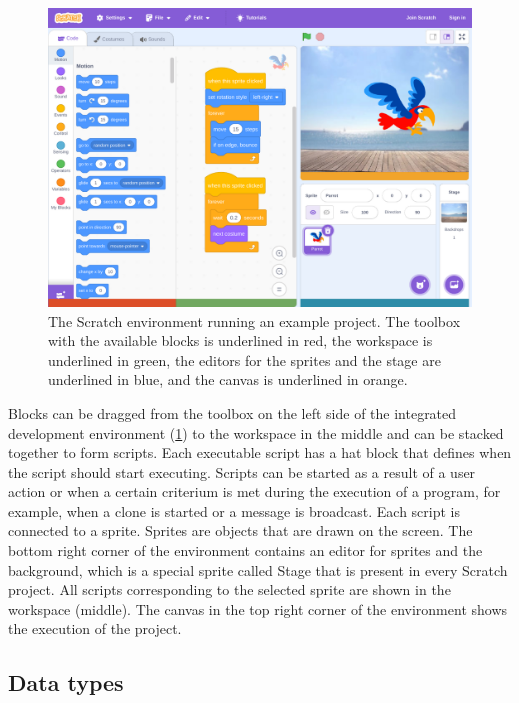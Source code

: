 \documentclass[../main]{subfiles}
\begin{document}
\begin{figure}
    \begin{wide}
        \includegraphics[width=\linewidth]{./scratch-ide}
    \end{wide}
    \caption{The Scratch environment running an example project.
    The toolbox with the available blocks is underlined in \textcolor{ugent-re}{red}, the workspace is underlined in \textcolor{ugent-ps}{green}, the editors for the sprites and the stage are underlined in \textcolor{ugent-we}{blue}, and the canvas is underlined in \textcolor{ugent-lw}{orange}.}
    \label{fig:scratch-environment}
\end{figure}

Blocks can be dragged from the toolbox on the left side of the integrated development environment (\cref{fig:scratch-environment}) to the workspace in the middle and can be stacked together to form scripts.
Each executable script has a hat block that defines when the script should start executing.
Scripts can be started as a result of a user action or when a certain criterium is met during the execution of a program, for example, when a clone is started or a message is broadcast.
Each script is connected to a sprite.
Sprites are objects that are drawn on the screen.
The bottom right corner of the environment contains an editor for sprites and the background, which is a special sprite called Stage that is present in every Scratch project.
All scripts corresponding to the selected sprite are shown in the workspace (middle).
The canvas in the top right corner of the environment shows the execution of the project.

\subsection{Data types}\label{subsec:scratch-data-types}
\end{document}
